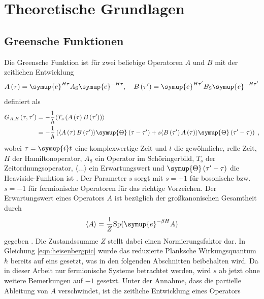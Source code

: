 \chapter{Theoretische Grundlagen}
\label{chap:theoretische_grundlagen}
\section{Greensche Funktionen}
Die Greensche Funktion ist für zwei beliebige Operatoren $A$ und $B$ mit der zeitlichen Entwicklung 
\begin{equation}
    A \left ( \tau \right ) = \symup{e}^{H \tau} A_\text{S} \symup{e}^{-H \tau}  \label{eqn:heisenbergpic}, 
    \quad B \left ( \tau' \right ) = \symup{e}^{H \tau'} B_\text{S} \symup{e}^{-H \tau'}
\end{equation}
definiert als 
\begin{align}
    G_{A,B} \left (\tau, \tau' \right ) &= - \frac{1}{\hbar} \langle T_s \left ( A \left (\tau \right ) B \left ( \tau' \right ) \right ) \rangle \\
    & = - \frac{1}{\hbar} \left(  \langle A \left (\tau \right ) B \left ( \tau' \right ) \rangle \symup{\Theta} \left ( \tau - \tau' \right) + s 
    \langle B \left ( \tau' \right ) A \left (\tau \right ) \rangle \symup{\Theta} \left ( \tau' - \tau \right)  \right ) \; \text{,} \label{eqn:greensfunction}
\end{align}
wobei $\tau = \symup{i}t$ eine komplexwertige Zeit und $t$ die gewöhnliche, relle Zeit, $H$ der Hamiltonoperator, $A_\text{S}$ ein Operator im Schöringerbild, $T_s$ der Zeitordnungsoperator, 
$\langle \ldots \rangle$ ein Erwartungswert und $\symup{\Theta} \left ( \tau' - \tau \right)$ die Heaviside-Funktion ist \cite{greensfunction}.
Der Parameter $s$ sorgt mit $s=+1$ für bosonische bzw. $s=-1$ für fermionische Operatoren für das richtige Vorzeichen.
Der Erwartungswert eines Operators $A$ ist bezüglich der großkanonischen Gesamtheit durch 
\begin{equation*}
    \langle A \rangle = \frac{1}{Z} \text{Sp}(\symup{e}^{-\beta H} A)
\end{equation*}
gegeben \cite{greensfunction}.
Die Zustandssumme $Z$ stellt dabei einen Normierungsfaktor dar.
In Gleichung \eqref{eqn:heisenbergpic} wurde das reduzierte Planksche Wirkungsquantum $\hbar$ bereits auf eins gesetzt, was in den folgenden Abschnitten beibehalten wird.
Da in dieser Arbeit nur fermionische Systeme betrachtet werden, wird $s$ ab jetzt ohne weitere Bemerkungen auf $-1$ gesetzt.
Unter der Annahme, dass die partielle Ableitung von $A$ verschwindet, ist die zeitliche Entwicklung eines Operators 
